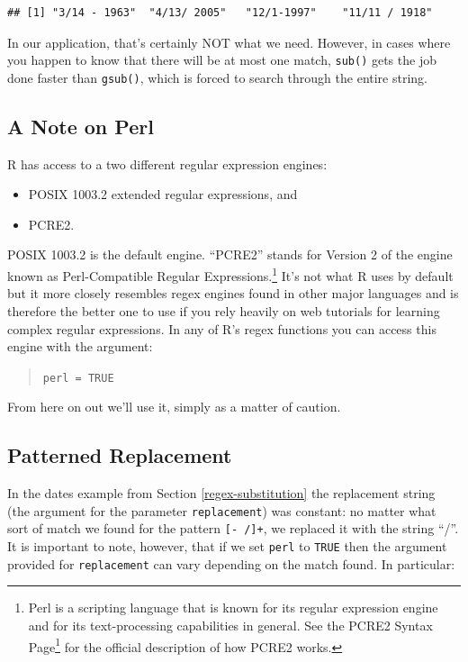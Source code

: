 \documentclass[]{book}
\providecommand{\tightlist}{%
  \setlength{\itemsep}{0pt}\setlength{\parskip}{0pt}}
\let\rmarkdownfootnote\footnote%
\def\footnote{\protect\rmarkdownfootnote}
\renewcommand{\href}[2]{#2\footnote{\url{#1}}}
\renewcommand{\href}[2]{#2\footnote{\url{#1}}}
\theoremstyle{definition}
\theoremstyle{definition}
\theoremstyle{definition}
\theoremstyle{remark}
\begin{document}
{\begin{verbatim}
## [1] "3/14 - 1963"  "4/13/ 2005"   "12/1-1997"    "11/11 / 1918"
\end{verbatim}

In our application, that's certainly NOT what we need. However, in cases
where you happen to know that there will be at most one match,
\texttt{sub()} gets the job done faster than \texttt{gsub()}, which is
forced to search through the entire string.

\subsection{A Note on Perl}\label{a-note-on-perl}

R has access to a two different regular expression engines:

\begin{itemize}
\tightlist
\item
  POSIX 1003.2 extended regular expressions, and
\item
  PCRE2.
\end{itemize}

POSIX 1003.2 is the default engine. ``PCRE2'' stands for Version 2 of
the engine known as Perl-Compatible Regular Expressions.\footnote{Perl
  is a scripting language that is known for its regular expression
  engine and for its text-processing capabilities in general. See the
  \href{http://www.pcre.org/current/doc/html/pcre2syntax.html}{PCRE2
  Syntax Page} for the official description of how PCRE2 works.} It's
not what R uses by default but it more closely resembles regex engines
found in other major languages and is therefore the better one to use if
you rely heavily on web tutorials for learning complex regular
expressions. In any of R's regex functions you can access this engine
with the argument:

\begin{quote}
\texttt{perl\ =\ TRUE}
\end{quote}

From here on out we'll use it, simply as a matter of caution.

\subsection{Patterned Replacement}\label{patterned-replacement}

In the dates example from Section \ref{regex-substitution} the
replacement string (the argument for the parameter \texttt{replacement})
was constant: no matter what sort of match we found for the pattern
\texttt{{[}-\ /{]}+}, we replaced it with the string ``/''. It is
important to note, however, that if we set \texttt{perl} to
\texttt{TRUE} then the argument provided for \texttt{replacement} can
vary depending on the match found. In particular:

}
\end{document}

